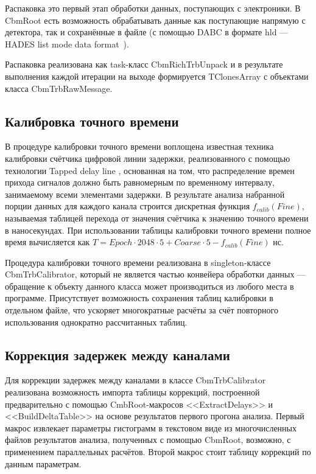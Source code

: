 Распаковка это первый этап обработки данных, поступающих с электроники. В CbmRoot есть возможность обрабатывать данные как поступающие напрямую с детектора, так и сохранённые в файле (с помощью DABC в формате hld --- HADES list mode data format~\cite{HLD}).

Распаковка реализована как task-класс CbmRichTrbUnpack и в результате выполнения каждой итерации на выходе формируется TClonesArray с объектами класса CbmTrbRawMessage.

\subsection{Калибровка точного времени}

В процедуре калибровки точного времени воплощена известная техника калибровки счётчика цифровой линии задержки, реализованного с помощью технологии Tapped delay line \cite{TDLCALIB}, основанная на том, что распределение времен прихода сигналов должно быть равномерным по временному интервалу, занимаемому всеми элементами задержки. В результате анализа набранной порции данных для каждого канала строится дискретная функция $ f_{calib}(Fine) $, называемая таблицей перехода от значения счётчика к значению точного времени в наносекундах. При использовании таблицы калибровки точного времени полное время вычисляется как $ T = Epoch \cdot 2048 \cdot 5 + Coarse \cdot 5 - f_{calib}(Fine) $ нс.

Процедура калибровки точного времени реализована в singleton-классе CbmTrbCalibrator, который не является частью конвейера обработки данных --- обращение к объекту данного класса может производиться из любого места в программе. Присутствует возможность сохранения таблиц калибровки в отдельном файле, что ускоряет многократные расчёты за счёт повторного использования однократно рассчитанных таблиц.

\subsection{Коррекция задержек между каналами}

Для коррекции задержек между каналами в классе CbmTrbCalibrator реализована возможность импорта таблицы коррекций, построенной предварительно с помощью CmbRoot-макросов <<ExtractDelays>> и <<BuildDeltaTable>> на основе результатов первого прогона анализа. Первый макрос извлекает параметры гистограмм в текстовом виде из многочисленных файлов результатов анализа, полученных с помощью CbmRoot, возможно, с применением параллельных расчётов. Второй макрос стоит таблицу коррекций по данным параметрам.

